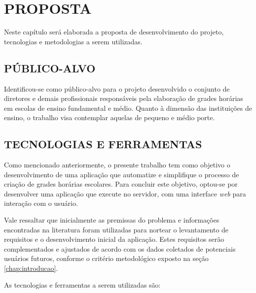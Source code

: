 
\chapter{PROPOSTA}
\label{chap:proposta}
Neste capítulo será elaborada a proposta de desenvolvimento do projeto, tecnologias e metodologias a serem utilizadas.

\section{PÚBLICO-ALVO}
Identificou-se como público-alvo para o projeto desenvolvido o conjunto de diretores e demais profissionais responsáveis pela elaboração de grades horárias em escolas de ensino fundamental e médio. Quanto à dimensão das instituições de ensino, o trabalho visa contemplar aquelas de pequeno e médio porte.

\section{TECNOLOGIAS E FERRAMENTAS}
Como mencionado anteriormente, o presente trabalho tem como objetivo o desenvolvimento de uma aplicação que automatize e simplifique o processo de criação de grades horárias escolares. Para concluir este objetivo, optou-se por desenvolver uma aplicação que execute no servidor, com uma interface \textit{web} para interação com o usuário. 

Vale ressaltar que inicialmente as premissas do problema e informações encontradas na literatura foram utilizadas para nortear o levantamento de requisitos e o desenvolvimento inicial da aplicação. Estes requisitos serão complementados e ajustados de acordo com os dados coletados de potenciais usuários futuros, conforme o critério metodológico exposto na seção \ref{chap:introducao}.

As tecnologias e ferramentas a serem utilizadas são:


